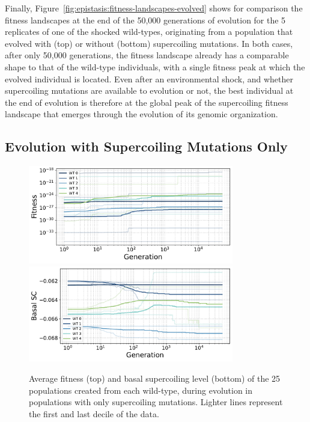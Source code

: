 Finally, Figure~\ref{fig:epistasis:fitness-landscapes-evolved} shows for comparison the fitness landscapes at the end of the 50,000 generations of evolution for the 5 replicates of one of the shocked wild-types, originating from a population that evolved with (top) or without (bottom) supercoiling mutations.
In both cases, after only 50,000 generations, the fitness landscape already has a comparable shape to that of the wild-type individuals, with a single fitness peak at which the evolved individual is located.
Even after an environmental shock, and whether supercoiling mutations are available to evolution or not, the best individual at the end of evolution is therefore at the global peak of the supercoiling fitness landscape that emerges through the evolution of its genomic organization.

\subsection{Evolution with Supercoiling Mutations Only}

\begin{figure}
\centering
\includegraphics[width=0.8\textwidth]{epistasis/img/sc-only/fitness_per_wt.pdf}
\includegraphics[width=0.8\textwidth]{epistasis/img/sc-only/sc_per_wt.pdf}
\caption[Average basal supercoiling and fitness during evolution with only basal supercoiling level mutations]{Average fitness (top) and basal supercoiling level (bottom) of the 25 populations created from each wild-type, during evolution in populations with only supercoiling mutations.
Lighter lines represent the first and last decile of the data.}
\label{fig:epistasis:sc-only-evolution}
\end{figure}

